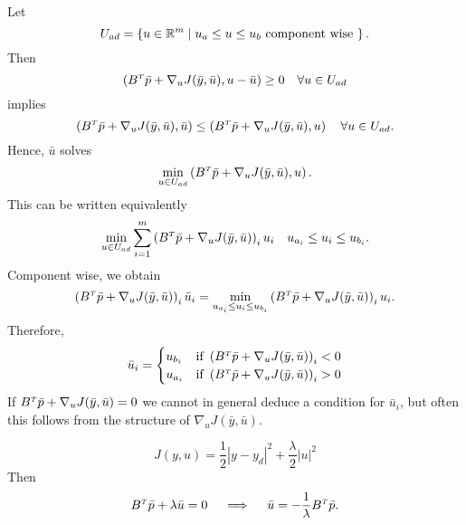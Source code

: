 \documentclass[../skript.tex]{subfiles}
\begin{document}
\begin{example}
Let
\[
U_{ad} = \left\{ u \in \mathbb{R}^m \mathrel{}\middle|\mathrel{} u_a \leq u \leq u_b \text{ component wise } \right\}.
\]
Then
\[
	\left( B^\tp \bar{p} + \nabla_u J(\bar{y}, \bar{u}), u - \bar{u} \right) \geq 0 \quad \forall u \in U_{ad}
\]
implies
\[
	\left( B^\tp \bar{p} + \nabla_u J(\bar{y}, \bar{u}), \bar{u} \right) \leq \left( B^\tp  \bar{p} + \nabla_u J(\bar{y}, \bar{u}), u \right) \quad \forall u \in U_{ad}.
\]
Hence, $\bar{u}$ solves
\[
	\min_{u \in U_{ad}} \left( B^\tp \bar{p} + \nabla_u J(\bar{y}, \bar{u}), u \right).
\]
This can be written equivalently
\[
	\min_{u \in U_{ad}} \sum_{i=1}^m \left( B^\tp \bar{p} + \nabla_u J(\bar{y}, \bar{u}) \right)_i u_i \quad u_{a_i} \leq u_i \leq u_{b_i}.
\]
Component wise, we obtain
\[
	\left( B^\tp \bar{p} + \nabla_u J(\bar{y}, \bar{u}) \right)_i \bar{u}_i = \min_{u_{a_i} \leq u_i \leq u_{b_i}} \left( B^\tp \bar{p} + \nabla_u J(\bar{y}, \bar{u}) \right)_i u_i.
\]
Therefore,
\[
	\bar{u}_i = \begin{cases}
	u_{b_i} & \text{if } \left( B^\tp \bar{p} + \nabla_u J(\bar{y}, \bar{u}) \right)_i < 0 \\
	u_{a_i} & \text{if } \left( B^\tp \bar{p} + \nabla_u J(\bar{y}, \bar{u}) \right)_i > 0
	\end{cases}
\]
If $B^\tp \bar{p} + \nabla_u J(\bar{y}, \bar{u}) = 0$ we cannot in general deduce a condition for $\bar{u}_i$, but often this follows from the structure of $\nabla_u J(\bar{y}, \bar{u})$.
\begin{example}
\[
	J(y, u) = \frac{1}{2} |y -y_d|^2 + \frac{\lambda}{2} |u|^2
\]
Then
\[
	B^\tp \bar{p} + \lambda \bar{u} = 0 \quad \implies \quad \bar{u} = -\frac{1}{\lambda} B^\tp \bar{p}.
\]
\end{example}
\end{example}
\end{document}
